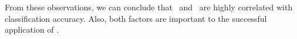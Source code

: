 From these observations, we can conclude that  \chn\ and \cnn\ are highly correlated with classification accuracy. 
Also, both factors are important to the successful application of \tcrs.




